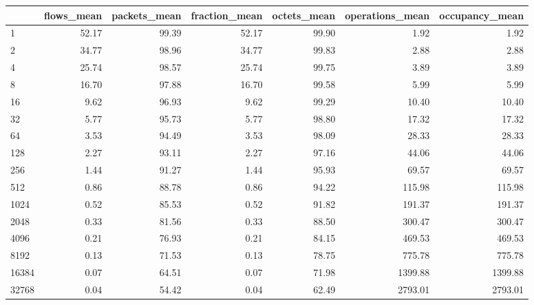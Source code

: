 \begin{tabular}{lrrrrrr}
\toprule
{} &  flows\_mean &  packets\_mean &  fraction\_mean &  octets\_mean &  operations\_mean &  occupancy\_mean \\
\midrule
1        &       52.17 &         99.39 &          52.17 &        99.90 &             1.92 &            1.92 \\
2        &       34.77 &         98.96 &          34.77 &        99.83 &             2.88 &            2.88 \\
4        &       25.74 &         98.57 &          25.74 &        99.75 &             3.89 &            3.89 \\
8        &       16.70 &         97.88 &          16.70 &        99.58 &             5.99 &            5.99 \\
16       &        9.62 &         96.93 &           9.62 &        99.29 &            10.40 &           10.40 \\
32       &        5.77 &         95.73 &           5.77 &        98.80 &            17.32 &           17.32 \\
64       &        3.53 &         94.49 &           3.53 &        98.09 &            28.33 &           28.33 \\
128      &        2.27 &         93.11 &           2.27 &        97.16 &            44.06 &           44.06 \\
256      &        1.44 &         91.27 &           1.44 &        95.93 &            69.57 &           69.57 \\
512      &        0.86 &         88.78 &           0.86 &        94.22 &           115.98 &          115.98 \\
1024     &        0.52 &         85.53 &           0.52 &        91.82 &           191.37 &          191.37 \\
2048     &        0.33 &         81.56 &           0.33 &        88.50 &           300.47 &          300.47 \\
4096     &        0.21 &         76.93 &           0.21 &        84.15 &           469.53 &          469.53 \\
8192     &        0.13 &         71.53 &           0.13 &        78.75 &           775.78 &          775.78 \\
16384    &        0.07 &         64.51 &           0.07 &        71.98 &          1399.88 &         1399.88 \\
32768    &        0.04 &         54.42 &           0.04 &        62.49 &          2793.01 &         2793.01 \\

\end{tabular}

